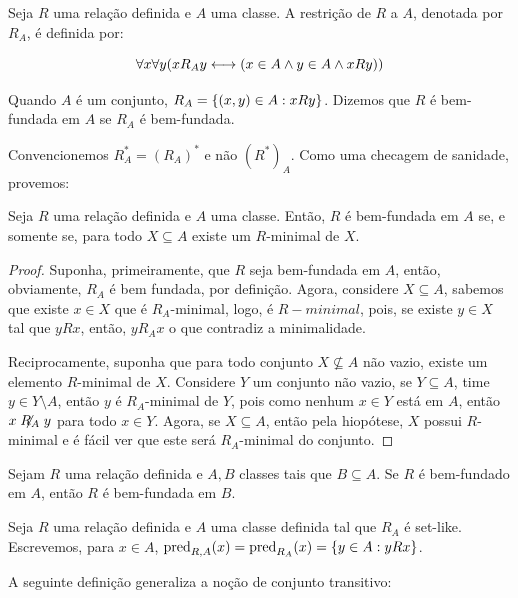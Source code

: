 \begin{definition}
    Seja $R$ uma relação definida e $A$ uma classe. A restrição de $R$ a $A$, denotada por $R_A$, é definida por:

    $$
    \forall x\forall y(xR_A y \longleftrightarrow (x\in A \land y\in A \land xRy))
    $$

    Quando $A$ é um conjunto, $R_A = \left\{ (x,y)\in A : xRy \right\}$. Dizemos que $R$ é bem-fundada em $A$ se $R_A$ é bem-fundada. 
\end{definition}

Convencionemos $R^*_A = (R_A)^*$ e não $(R^*)_A$. Como uma checagem de sanidade, provemos:

\begin{lemma}
    Seja $R$ uma relação definida e $A$ uma classe. Então, $R$ é bem-fundada em $A$ se, e somente se, para todo $X \subseteq A$ existe um $R$-minimal de $X$.
\end{lemma}
\begin{proof}
    Suponha, primeiramente, que $R$ seja bem-fundada em $A$, então, obviamente, $R_A$ é bem fundada, por definição. Agora, considere $X \subseteq A$, sabemos que existe $x\in X$ que é $R_A$-minimal, logo, é $R-minimal$, pois, se existe $y\in X$ tal que $yRx$, então, $y R_A x$ o que contradiz a minimalidade. 

    Reciprocamente, suponha que para todo conjunto $X \not\subseteq A$ não vazio, existe um elemento $R$-minimal de $X$. Considere $Y$ um conjunto não vazio, se $Y \subseteq A$, time $y \in Y\setminus A$, então $y$ é $R_A$-minimal de $Y$, pois como nenhum $x \in Y$ está em $A$, então $x\centernot{R_A} y$ para todo $x\in Y$. Agora, se $X \subseteq A$, então pela hiopótese, $X$ possui $R$-minimal e é fácil ver que este será $R_A$-minimal do conjunto.    
\end{proof}

\begin{corollary}
    Sejam $R$ uma relação definida e $A,B$ classes tais que $B \subseteq A$. Se $R$ é bem-fundado em $A$, então $R$ é bem-fundada em $B$. 
\end{corollary}

\begin{definition}
    Seja $R$ uma relação definida e $A$ uma classe definida tal que $R_A$ é set-like. Escrevemos, para $x\in A$, $\operatorname{pred}_{R,A}(x) = \operatorname{pred}_{R_A}(x) = \left\{ y\in A : yRx \right\}$.
\end{definition}

A seguinte definição generaliza a noção de conjunto transitivo:

